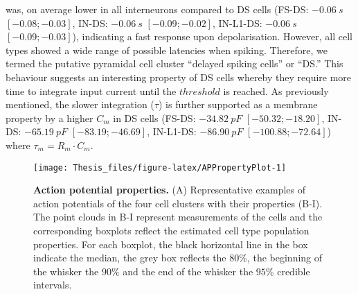 \documentclass[
  12pt,
  a4paper,
  openany]{book}
\begin{document}
was, on average lower in all interneurons compared to DS cells (FS-DS: \(-0.06\ s\) \([-0.08; -0.03]\), IN-DS: \(-0.06\ s\) \([-0.09; -0.02]\), IN-L1-DS: \(-0.06\ s\) \([-0.09; -0.03]\)), indicating a fast response upon depolarisation. However, all cell types showed a wide range of possible latencies when spiking. Therefore, we termed the putative pyramidal cell cluster ``delayed spiking cells'' or ``DS.'' This behaviour suggests an interesting property of DS cells whereby they require more time to integrate input current until the \(threshold\) is reached. As previously mentioned, the slower integration (\(\tau\)) is further supported as a membrane property by a higher \(C_{m}\) in DS cells (FS-DS: \(-34.82\ pF\) \([-50.32; -18.20]\), IN-DS: \(-65.19\ pF\) \([-83.19; -46.69]\), IN-L1-DS: \(-86.90\ pF\) \([-100.88; -72.64]\)) where \(\tau_{m} = R_{m}\cdot C_{m}\).




\begin{figure}[htbp]

{\centering \texttt{[image: Thesis\_files/figure-latex/APPropertyPlot-1]} 

}

\caption[Action potential properties]{\textbf{Action potential properties.} (A) Representative examples of action potentials of the four cell clusters with their properties (B-I). The point clouds in B-I represent measurements of the cells and the corresponding boxplots reflect the estimated cell type population properties. For each boxplot, the black horizontal line in the box indicate the median, the grey box reflects the \(80\%\), the beginning of the whisker the \(90\%\) and the end of the whisker the \(95\%\) credible intervals.}\label{fig:APPropertyPlot}
\end{figure}
\end{document}
